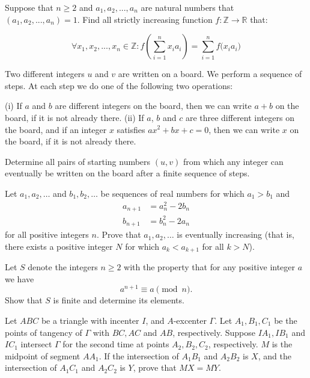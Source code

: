 \documentclass[11pt]{scrartcl}
\begin{document}
\begin{problem}
Suppose that $n\ge2$ and $a_1,a_2,...,a_n$ are natural numbers that $ (a_1,a_2,...,a_n)=1$. Find all strictly increasing function $f: \mathbb{Z}  \to \mathbb{R} $ that:

$$ \forall  x_1,x_2,...,x_n \in  \mathbb{Z} :       f(\sum_{i=1}^{n} {x_ia_i}) = \sum_{i=1}^{n} {f(x_ia_i})$$
\end{problem}
\begin{problem}[EGMO 2024/1]
Two different integers $u$ and $v$ are written on a board. We perform a sequence of steps. At each step we do one of the following two operations:

(i) If $a$ and $b$ are different integers on the board, then we can write $a + b$ on the board, if it is not
already there.
(ii) If $a$, $b$ and $c$ are three different integers on the board, and if an integer $x$ satisfies $ax^2 +bx+c = 0$,
then we can write $x$ on the board, if it is not already there.

Determine all pairs of starting numbers $(u, v)$ from which any integer can eventually be written on the board after a finite sequence of steps.
\end{problem}
\begin{problem}
Let $a_1, a_2, \dots$ and $b_1, b_2, \dots$ be sequences of real numbers for which $a_1 > b_1$ and
\begin{align*}
    a_{n+1} &= a_n^2 - 2b_n\\
    b_{n+1} &= b_n^2 - 2a_n
\end{align*}for all positive integers $n$. Prove that $a_1, a_2, \dots$ is eventually increasing (that is, there exists a positive integer $N$ for which $a_k < a_{k+1}$ for all $k > N$).
\end{problem}
\begin{problem}
Let $S$ denote the integers $n\ge 2$ with the property that for any positive integer $a$ we have$$a^{n+1} \equiv a \pmod n.$$Show that $S$ is finite and determine its elements.
\end{problem}
\begin{problem}[PAGMO 2021/6]
   Let $ABC$ be a triangle with incenter $I$, and $A$-excenter $\Gamma$. Let $A_1,B_1,C_1$ be the points of tangency of $\Gamma$ with $BC,AC$ and $AB$, respectively. Suppose $IA_1, IB_1$ and $IC_1$ intersect $\Gamma$ for the second time at points $A_2,B_2,C_2$, respectively. $M$ is the midpoint of segment $AA_1$. If the intersection of $A_1B_1$ and $A_2B_2$ is $X$, and the intersection of $A_1C_1$ and $A_2C_2$ is $Y$, prove that $MX=MY$.
\end{problem}
\end{document}
